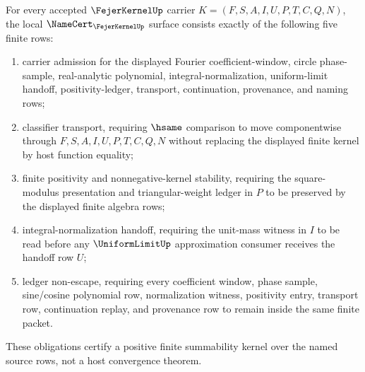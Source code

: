 \begin{theorem}\label{thm:fejer-kernel-namecert-obligations}
For every accepted $\FejerKernelUp$ carrier $K=(F,S,A,I,U,P,T,C,Q,N)$, the local $\NameCert_{\FejerKernelUp}$ surface consists exactly of the following five finite rows:
\begin{enumerate}
\item carrier admission for the displayed Fourier coefficient-window, circle phase-sample, real-analytic polynomial, integral-normalization, uniform-limit handoff, positivity-ledger, transport, continuation, provenance, and naming rows;
\item classifier transport, requiring $\hsame$ comparison to move componentwise through $F,S,A,I,U,P,T,C,Q,N$ without replacing the displayed finite kernel by host function equality;
\item finite positivity and nonnegative-kernel stability, requiring the square-modulus presentation and triangular-weight ledger in $P$ to be preserved by the displayed finite algebra rows;
\item integral-normalization handoff, requiring the unit-mass witness in $I$ to be read before any $\UniformLimitUp$ approximation consumer receives the handoff row $U$;
\item ledger non-escape, requiring every coefficient window, phase sample, sine/cosine polynomial row, normalization witness, positivity entry, transport row, continuation replay, and provenance row to remain inside the same finite packet.
\end{enumerate}
These obligations certify a positive finite summability kernel over the named source rows, not a host convergence theorem.
\end{theorem}
